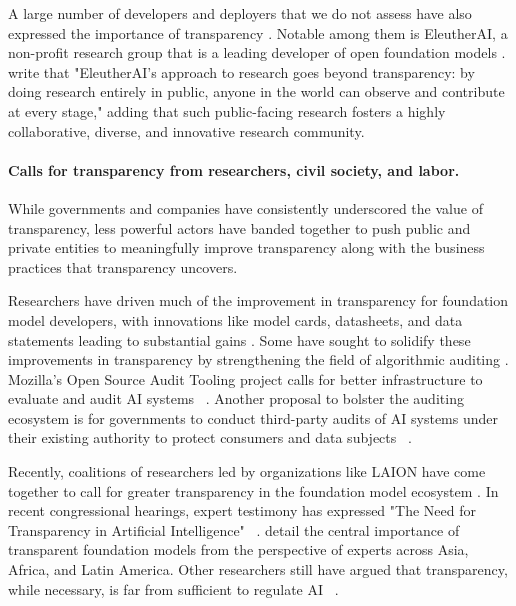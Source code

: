 A large number of developers and deployers that we do not assess have also expressed the importance of transparency \citep{jobin2019global,fjeld2020principled,wef2023presidio}. Notable among them is EleutherAI, a non-profit research group that is a leading developer of open foundation models \citep{skowron2023euaiact}. 
\citet{phang2022eleutherai} write that "EleutherAI’s approach to research goes beyond transparency: by doing research entirely in public, anyone in the world can observe and contribute at every stage," adding that such public-facing research fosters a highly collaborative, diverse, and innovative research community. 

\paragraph{\textbf{Calls for transparency from researchers, civil society, and labor.}}

While governments and companies have consistently underscored the value of transparency, less powerful actors have banded together to push public and private entities to meaningfully improve transparency along with the business practices that transparency uncovers. 

Researchers have driven much of the improvement in transparency for foundation model developers, with innovations like model cards, datasheets, and data statements leading to substantial gains \citep{mitchell2018modelcards,gebru2018datasheets,bender-friedman-2018-data}.
Some have sought to solidify these improvements in transparency by strengthening the field of algorithmic auditing \citep{costanzachock2022audit}. 
Mozilla's Open Source Audit Tooling project calls for better infrastructure to evaluate and audit AI systems ~\citep{raji2022mozilla}.
Another proposal to bolster the auditing ecosystem is for governments to conduct third-party audits of AI systems under their existing authority to protect consumers and data subjects ~\citep{miller2021radical}.

Recently, coalitions of researchers led by organizations like LAION have come together to call for greater transparency in the foundation model ecosystem \citep{laion2023transparentai}.
In recent congressional hearings, expert testimony has expressed "The Need for Transparency in Artificial Intelligence" ~\citep{gregory2023testimony}.
\citet{belli2023igf} detail the central importance of transparent foundation models from the perspective of experts across Asia, Africa, and Latin America. 
Other researchers still have argued that transparency, while necessary, is far from sufficient to regulate AI ~\citep{hartzog2023oversight}.

